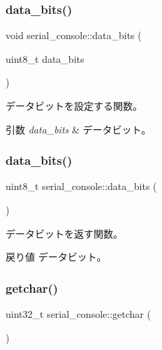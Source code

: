 \subsubsection{\texorpdfstring{data\+\_\+bits()}{data\_bits()}\hspace{0.1cm}{\footnotesize\ttfamily [1/2]}}
{\footnotesize\ttfamily void serial\+\_\+console\+::data\+\_\+bits (\begin{DoxyParamCaption}\item[{uint8\+\_\+t}]{data\+\_\+bits }\end{DoxyParamCaption})}

データビットを設定する関数。 
\begin{DoxyParams}{引数}
{\em data\+\_\+bits} & データビット。 \\
\hline
\end{DoxyParams}
\hypertarget{classserial__console_ac80a35d0277fe55a5fc1dd1b81d062c0}{}\label{classserial__console_ac80a35d0277fe55a5fc1dd1b81d062c0} 
\subsubsection{\texorpdfstring{data\+\_\+bits()}{data\_bits()}\hspace{0.1cm}{\footnotesize\ttfamily [2/2]}}
{\footnotesize\ttfamily uint8\+\_\+t serial\+\_\+console\+::data\+\_\+bits (\begin{DoxyParamCaption}{ }\end{DoxyParamCaption})}

データビットを返す関数。 \begin{DoxyReturn}{戻り値}
データビット。 
\end{DoxyReturn}
\hypertarget{classserial__console_a63393073ee917b8d5ecd04922e8b0219}{}\label{classserial__console_a63393073ee917b8d5ecd04922e8b0219} 
\subsubsection{\texorpdfstring{getchar()}{getchar()}}
{\footnotesize\ttfamily uint32\+\_\+t serial\+\_\+console\+::getchar (\begin{DoxyParamCaption}{ }\end{DoxyParamCaption})\hspace{0.3cm}{\ttfamily [virtual]}}

